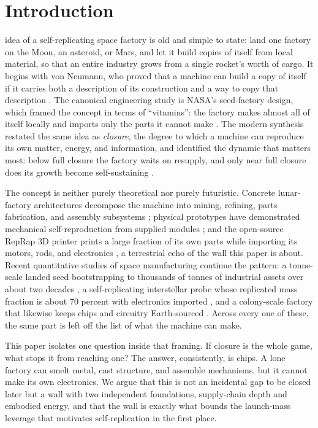 \section{Introduction}

 idea of a self-replicating space factory is old and simple to state:
land one factory on the Moon, an asteroid, or Mars, and let it build copies of itself from
local material, so that an entire industry grows from a single rocket's worth of cargo. It
begins with von Neumann, who proved that a machine can build a copy of itself if it carries
both a description of its construction and a way to copy that description
\cite{von-neumann-burks-1966}. The canonical engineering study is NASA's seed-factory
design, which framed the concept in terms of ``vitamins'': the factory makes almost all of
itself locally and imports only the parts it cannot make \cite{nasa-cp-2255-1980}. The
modern synthesis restated the same idea as \emph{closure}, the degree to which a machine
can reproduce its own matter, energy, and information, and identified the dynamic that
matters most: below full closure the factory waits on resupply, and only near full closure
does its growth become self-sustaining \cite{freitas-merkle-2004}.

The concept is neither purely theoretical nor purely futuristic. Concrete lunar-factory
architectures decompose the machine into mining, refining, parts fabrication, and assembly
subsystems \cite{chirikjian-2004-niac,moses-chirikjian-2020}; physical prototypes have
demonstrated mechanical self-reproduction from supplied modules \cite{zykov-lipson-2005};
and the open-source RepRap 3D printer prints a large fraction of its own parts while
importing its motors, rods, and electronics \cite{reprap-jones-2011}, a terrestrial echo of
the wall this paper is about. Recent quantitative studies of space manufacturing continue
the pattern: a tonne-scale landed seed bootstrapping to thousands of tonnes of industrial
assets over about two decades \cite{metzger-2013}, a self-replicating interstellar probe
whose replicated mass fraction is about 70 percent with electronics imported
\cite{borgue-hein-2020}, and a colony-scale factory that likewise keeps chips and circuitry
Earth-sourced \cite{guided-self-replicating-factory-2021}. Across every one of these, the
same part is left off the list of what the machine can make.

This paper isolates one question inside that framing. If closure is the whole game, what
stops it from reaching one? The answer, consistently, is chips. A lone factory can smelt
metal, cast structure, and assemble mechanisms, but it cannot make its own electronics. We
argue that this is not an incidental gap to be closed later but a wall with two independent
foundations, supply-chain depth and embodied energy, and that the wall is exactly what
bounds the launch-mass leverage that motivates self-replication in the first place.
